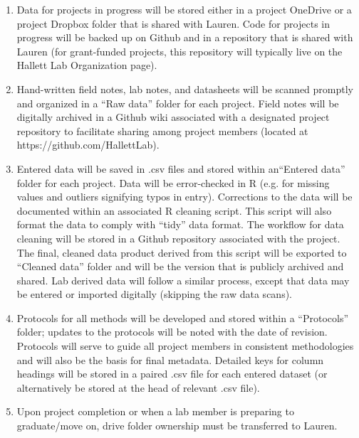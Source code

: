 \documentclass[12pt]{article}
\begin{document}
\begin{enumerate}
\item Data for projects in progress will be stored either in a project OneDrive or a project Dropbox folder that is shared with Lauren. Code for projects in progress will be backed up on Github and in a repository that is shared with Lauren (for grant-funded projects, this repository will typically live on the Hallett Lab Organization page).
\item Hand-written field notes, lab notes, and datasheets will be scanned promptly and organized in a “Raw data” folder for each project. Field notes will be digitally archived in a Github wiki associated with a designated project repository to facilitate sharing among project members (located at https://github.com/HallettLab).
\item Entered data will be saved in .csv files and stored within an``Entered data'' folder for each project. Data will be error-checked in R (e.g. for missing values and outliers signifying typos in entry). Corrections to the data will be documented within an associated R cleaning script. This script will also format the data to comply with ``tidy'' data format. The workflow for data cleaning will be stored in a Github repository associated with the project. The final, cleaned data product derived from this script will be exported to ``Cleaned data'' folder and will be the version that is publicly archived and shared. Lab derived data will follow a similar process, except that data may be entered or imported digitally (skipping the raw data scans).
\item Protocols for all methods will be developed and stored within a ``Protocols'' folder; updates to the protocols will be noted with the date of revision. Protocols will serve to guide all project members in consistent methodologies and will also be the basis for final metadata. Detailed keys for column headings will be stored in a paired .csv file for each entered dataset (or alternatively be stored at the head of relevant .csv file).
\item Upon project completion or when a lab member is preparing to graduate/move on, drive folder ownership must be transferred to Lauren. 

\end{enumerate}
\end{document}
